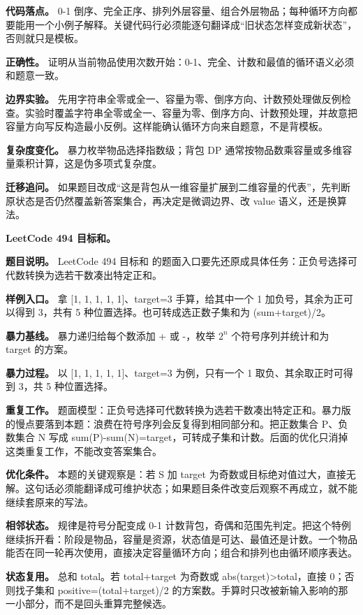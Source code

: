 \textbf{代码落点。} 0-1 倒序、完全正序、排列外层容量、组合外层物品；每种循环方向都要能用一个小例子解释。关键代码行必须能逐句翻译成“旧状态怎样变成新状态”，否则就只是模板。

\textbf{正确性。} 证明从当前物品使用次数开始：0-1、完全、计数和最值的循环语义必须和题意一致。

\textbf{边界实验。} 先用字符串全零或全一、容量为零、倒序方向、计数预处理做反例检查。实验时覆盖字符串全零或全一、容量为零、倒序方向、计数预处理，并故意把容量方向写反构造最小反例。这样能确认循环方向来自题意，不是背模板。

\textbf{复杂度变化。} 暴力枚举物品选择指数级；背包 DP 通常按物品数乘容量或多维容量乘积计算，这是伪多项式复杂度。

\textbf{迁移追问。} 如果题目改成“这是背包从一维容量扩展到二维容量的代表”，先判断原状态是否仍然覆盖新答案集合，再决定是微调边界、改 value 语义，还是换算法。

\noindent\textbf{LeetCode 494 目标和。}

\textbf{题目说明。} LeetCode 494 目标和 的题面入口要先还原成具体任务：正负号选择可代数转换为选若干数凑出特定正和。

\textbf{样例入口。} 拿 [1, 1, 1, 1, 1]、target=3 手算，给其中一个 1 加负号，其余为正可以得到 3，共有 5 种位置选择。也可转成选正数子集和为 (sum+target)/2。

\textbf{暴力基线。} 暴力递归给每个数添加 + 或 -，枚举 \ensuremath{2^{n}} 个符号序列并统计和为 target 的方案。

\textbf{暴力过程。} 以 [1, 1, 1, 1, 1]、target=3 为例，只有一个 1 取负、其余取正时可得到 3，共 5 种位置选择。

\textbf{重复工作。} 题面模型：正负号选择可代数转换为选若干数凑出特定正和。暴力版的慢点要落到本题：浪费在符号序列会反复得到相同部分和。把正数集合 P、负数集合 N 写成 sum(P)-sum(N)=target，可转成子集和计数。后面的优化只消掉这类重复工作，不能改变答案集合。

\textbf{优化条件。} 本题的关键观察是：若 S 加 target 为奇数或目标绝对值过大，直接无解。这句话必须能翻译成可维护状态；如果题目条件改变后观察不再成立，就不能继续套原来的写法。

\textbf{相邻状态。} 规律是符号分配变成 0-1 计数背包，奇偶和范围先判定。把这个特例继续拆开看：阶段是物品，容量是资源，状态值是可达、最值还是计数。一个物品能否在同一轮再次使用，直接决定容量循环方向；组合和排列也由循环顺序表达。

\textbf{状态复用。} 总和 total。若 total+target 为奇数或 abs(target)>total，直接 0；否则找子集和 positive=(total+target)/2 的方案数。手算时只改被新输入影响的那一小部分，而不是回头重算完整候选。

